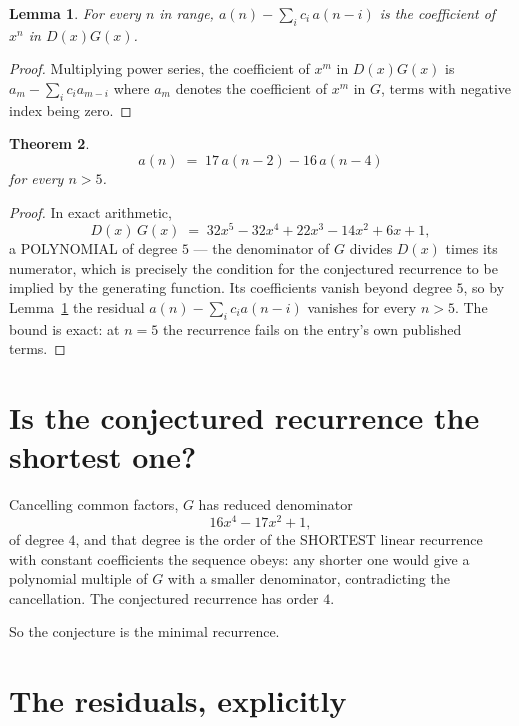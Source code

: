 \documentclass[11pt,a4paper]{article}
\theoremstyle{plain}
\newtheorem{theorem}{Theorem}
\newtheorem{lemma}[theorem]{Lemma}
\theoremstyle{definition}
\begin{document}
\begin{lemma}\label{lem:key}
For every $n$ in range, $a(n)-\sum_i c_i\,a(n-i)$ is the coefficient of $x^{n}$ in
$D(x)G(x)$.
\end{lemma}

\begin{proof}
Multiplying power series, the coefficient of $x^{m}$ in $D(x)G(x)$ is
$a_m-\sum_i c_i a_{m-i}$ where $a_m$ denotes the coefficient of $x^{m}$ in $G$, terms with
negative index being zero.
\end{proof}

\begin{theorem}
\[
a(n)\;=\;17\,a(n-2) - 16\,a(n-4)
\]
for every $n>5$.
\end{theorem}

\begin{proof}
In exact arithmetic,
\[
D(x)\,G(x)\;=\;32 x^{5} - 32 x^{4} + 22 x^{3} - 14 x^{2} + 6 x + 1,
\]
a POLYNOMIAL of degree $5$ --- the denominator of $G$ divides $D(x)$ times its numerator,
which is precisely the condition for the conjectured recurrence to be implied by the
generating function. Its coefficients vanish beyond degree $5$, so by
Lemma~\ref{lem:key} the residual $a(n)-\sum_ic_ia(n-i)$ vanishes for every
$n>5$. The bound is exact: at $n=5$ the recurrence fails on the entry's own published terms.
\end{proof}

\section{Is the conjectured recurrence the shortest one?}

Cancelling common factors, $G$ has reduced denominator
\[
16 x^{4} - 17 x^{2} + 1,
\]
of degree $4$, and that degree is the order of the SHORTEST linear recurrence with
constant coefficients the sequence obeys: any shorter one would give a polynomial multiple of
$G$ with a smaller denominator, contradicting the cancellation. The conjectured recurrence has
order $4$.

So the conjecture is the minimal recurrence.

\section{The residuals, explicitly}
\end{document}
